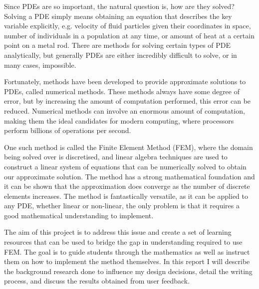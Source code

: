 Since PDEs are so important, the natural question is, how are they solved? Solving a PDE simply means obtaining an equation that describes the key variable explicitly, e.g. velocity of fluid particles given their coordinates in space, number of individuals in a population at any time, or amount of heat at a certain point on a metal rod. There are methods for solving certain types of PDE analytically, but generally PDEs are either incredibly difficult to solve, or in many cases, impossible.

Fortunately, methods have been developed to provide approximate solutions to PDEs, called numerical methods. These methods always have some degree of error, but by increasing the amount of computation performed, this error can be reduced. Numerical methods can involve an enormous amount of computation, making them the ideal candidates for modern computing, where processors perform billions of operations per second.

One such method is called the Finite Element Method (FEM), where the domain being solved over is discretised, and linear algebra techniques are used to construct a linear system of equations that can be numerically solved to obtain our approximate solution\cite{brenner-scott-fem}. The method has a strong mathematical foundation and it can be shown that the approximation does converge as the number of discrete elements increases\cite{bengzon-larson-fem}. The method is fantastically versatile, as it can be applied to any PDE, whether linear or non-linear, the only problem is that it requires a good mathematical understanding to implement.

The aim of this project is to address this issue and create a set of learning resources that can be used to bridge the gap in understanding required to use FEM. The goal is to guide students through the mathematics as well as instruct them on how to implement the method themselves. In this report I will describe the background research done to influence my design decisions, detail the writing process, and discuss the results obtained from user feedback.




